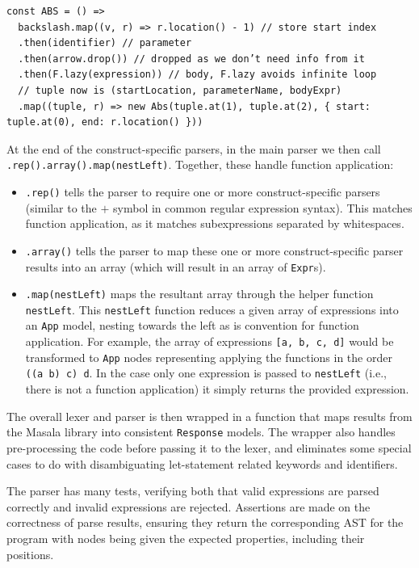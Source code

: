 \documentclass[a4paper,fleqn,oneside,12pt]{report}
\begin{document}
\begin{verbatim}
const ABS = () =>
  backslash.map((v, r) => r.location() - 1) // store start index
  .then(identifier) // parameter
  .then(arrow.drop()) // dropped as we don’t need info from it
  .then(F.lazy(expression)) // body, F.lazy avoids infinite loop
  // tuple now is (startLocation, parameterName, bodyExpr)
  .map((tuple, r) => new Abs(tuple.at(1), tuple.at(2), { start: tuple.at(0), end: r.location() }))
\end{verbatim}
At the end of the construct-specific parsers, in the main parser we then call \texttt{.rep().array().map(nestLeft)}. Together, these handle function application:
\begin{itemize}
  \item \texttt{.rep()} tells the parser to require one or more construct-specific parsers (similar to the $+$ symbol in common regular expression syntax). This matches function application, as it matches subexpressions separated by whitespaces.
  \item \texttt{.array()} tells the parser to map these one or more construct-specific parser results into an array (which will result in an array of \texttt{Expr}s).
  \item \texttt{.map(nestLeft)} maps the resultant array through the helper function \texttt{nestLeft}. This \texttt{nestLeft} function reduces a given array of expressions into an \texttt{App} model, nesting towards the left as is convention for function application. For example, the array of expressions \texttt{[a, b, c, d]} would be transformed to \texttt{App} nodes representing applying the functions in the order \texttt{((a b) c) d}. In the case only one expression is passed to \texttt{nestLeft} (i.e., there is not a function application) it simply returns the provided expression.
\end{itemize}

The overall lexer and parser is then wrapped in a function that maps results from the Masala library into consistent \texttt{Response} models. The wrapper also handles pre-processing the code before passing it to the lexer, and eliminates some special cases to do with disambiguating let-statement related keywords and identifiers.

The parser has many tests, verifying both that valid expressions are parsed correctly and invalid expressions are rejected. Assertions are made on the correctness of parse results, ensuring they return the corresponding AST for the program with nodes being given the expected properties, including their positions.
\end{document}
